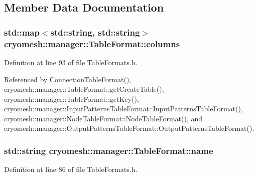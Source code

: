 \subsection{\-Member \-Data \-Documentation}
\hypertarget{structcryomesh_1_1manager_1_1TableFormat_a29ab6f4cfc0c56da1fa461ea665a1b61}{
\subsubsection[{columns}]{\setlength{\rightskip}{0pt plus 5cm}std\-::map$<$std\-::string, std\-::string$>$ {\bf cryomesh\-::manager\-::\-Table\-Format\-::columns}}}\label{structcryomesh_1_1manager_1_1TableFormat_a29ab6f4cfc0c56da1fa461ea665a1b61}


\-Definition at line 93 of file \-Table\-Formats.\-h.



\-Referenced by \-Connection\-Table\-Format(), cryomesh\-::manager\-::\-Table\-Format\-::get\-Create\-Table(), cryomesh\-::manager\-::\-Table\-Format\-::get\-Key(), cryomesh\-::manager\-::\-Input\-Patterns\-Table\-Format\-::\-Input\-Patterns\-Table\-Format(), cryomesh\-::manager\-::\-Node\-Table\-Format\-::\-Node\-Table\-Format(), and cryomesh\-::manager\-::\-Output\-Patterns\-Table\-Format\-::\-Output\-Patterns\-Table\-Format().

\hypertarget{structcryomesh_1_1manager_1_1TableFormat_ab49912897ccb7fd0f8d42f1cc21332e8}{
\subsubsection[{name}]{\setlength{\rightskip}{0pt plus 5cm}std\-::string {\bf cryomesh\-::manager\-::\-Table\-Format\-::name}}}\label{structcryomesh_1_1manager_1_1TableFormat_ab49912897ccb7fd0f8d42f1cc21332e8}


\-Definition at line 86 of file \-Table\-Formats.\-h.



